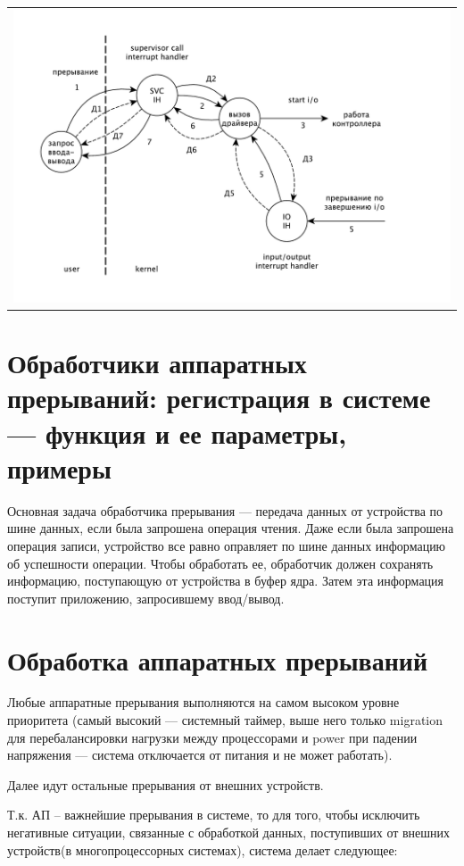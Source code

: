 \begin{table}[h!]
  \centering
  \begin{tabular}{p{1\linewidth}}
    \centering
    \includegraphics[width=0.8\linewidth]{./images/driver.pdf}
  \end{tabular}
\end{table}

\section{Обработчики аппаратных прерываний: регистрация в системе --- функция и ее параметры, примеры}

Основная задача обработчика прерывания --- передача данных от устройства по шине данных, если была запрошена операция чтения. Даже если была запрошена операция записи, устройство все равно оправляет по шине данных информацию об успешности операции. Чтобы обработать ее, обработчик должен сохранять информацию, поступающую от устройства в буфер ядра. Затем эта информация поступит приложению, запросившему ввод/вывод.

\section{Обработка аппаратных прерываний}
Любые аппаратные прерывания выполняются на самом высоком уровне приоритета (самый высокий --- системный таймер, выше него только migration для перебалансировки нагрузки между процессорами и power при падении напряжения --- система отключается от питания и не может работать).

Далее идут остальные прерывания от внешних устройств.

Т.к. АП -- важнейшие прерывания в системе, то для того, чтобы исключить негативные ситуации, связанные с обработкой данных, поступивших от внешних устройств(в многопроцессорных системах), система делает следующее:

